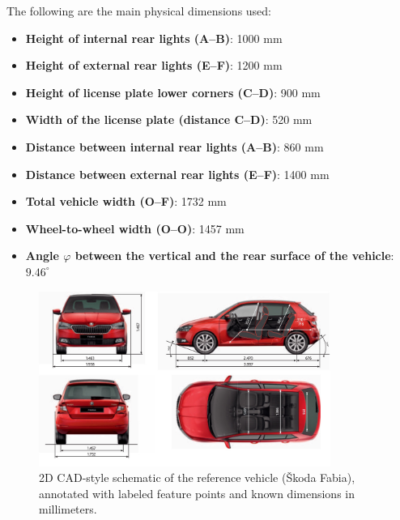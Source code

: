 The following are the main physical dimensions used:

\begin{itemize}
    \item \textbf{Height of internal rear lights (A–B)}: 1000 mm
    \item \textbf{Height of external rear lights (E–F)}: 1200 mm
    \item \textbf{Height of license plate lower corners (C–D)}: 900 mm
    \item \textbf{Width of the license plate (distance C–D)}: 520 mm
    \item \textbf{Distance between internal rear lights (A–B)}: 860 mm
    \item \textbf{Distance between external rear lights (E–F)}: 1400 mm
    \item \textbf{Total vehicle width (O–F)}: 1732 mm
    \item \textbf{Wheel-to-wheel width (O–O)}: 1457 mm
    \item \textbf{Angle $\varphi$ between the vertical and the rear surface of the vehicle}: $9.46^\circ$
\end{itemize}

\begin{figure}[htbp]
    \centering
    \includegraphics[width=0.85\textwidth]{Images/cad.jpg}
    \caption{2D CAD-style schematic of the reference vehicle (Škoda Fabia), annotated with labeled feature points and known dimensions in millimeters.}
    \label{fig:car-cad-model}
\end{figure}